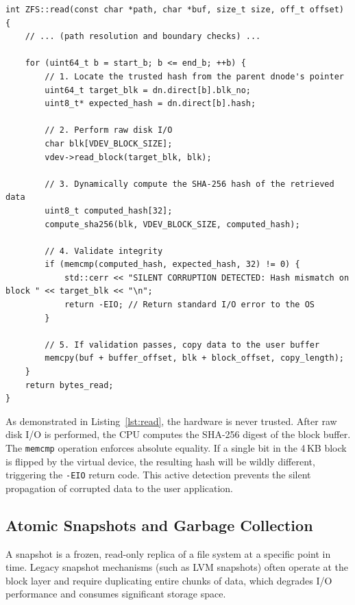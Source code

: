 \documentclass[pdflatex,sn-mathphys-num]{sn-jnl}
\begin{document}
\begin{lstlisting}[caption={Active Merkle tree integrity validation during read operations.}, label={lst:read}]
int ZFS::read(const char *path, char *buf, size_t size, off_t offset) {
    // ... (path resolution and boundary checks) ...
    
    for (uint64_t b = start_b; b <= end_b; ++b) {
        // 1. Locate the trusted hash from the parent dnode's pointer
        uint64_t target_blk = dn.direct[b].blk_no;
        uint8_t* expected_hash = dn.direct[b].hash;

        // 2. Perform raw disk I/O
        char blk[VDEV_BLOCK_SIZE];
        vdev->read_block(target_blk, blk);

        // 3. Dynamically compute the SHA-256 hash of the retrieved data
        uint8_t computed_hash[32];
        compute_sha256(blk, VDEV_BLOCK_SIZE, computed_hash);

        // 4. Validate integrity
        if (memcmp(computed_hash, expected_hash, 32) != 0) {
            std::cerr << "SILENT CORRUPTION DETECTED: Hash mismatch on block " << target_blk << "\n";
            return -EIO; // Return standard I/O error to the OS
        }

        // 5. If validation passes, copy data to the user buffer
        memcpy(buf + buffer_offset, blk + block_offset, copy_length);
    }
    return bytes_read;
}
\end{lstlisting}

As demonstrated in Listing~\ref{lst:read}, the hardware is never trusted. After raw disk I/O is performed, the CPU computes the SHA-256 digest of the block buffer. The \verb+memcmp+ operation enforces absolute equality. If a single bit in the 4\,KB block is flipped by the virtual device, the resulting hash will be wildly different, triggering the \verb+-EIO+ return code. This active detection prevents the silent propagation of corrupted data to the user application.

\subsection{Atomic Snapshots and Garbage Collection}\label{subsec:snap}


A snapshot is a frozen, read-only replica of a file system at a specific point in time. Legacy snapshot mechanisms (such as LVM snapshots) often operate at the block layer and require duplicating entire chunks of data, which degrades I/O performance and consumes significant storage space.
\end{document}
